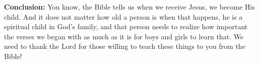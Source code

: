 \textbf{Conclusion: } You know, the Bible tells us when we receive Jesus, we become His child.  And it does not matter how old a person is when that happens, he is a spiritual child in God’s family, and that person needs to realize how important the verses we began with as much as it is for boys and girls to learn that.  We need to thank the Lord for those willing to teach these things to you from the Bible!








